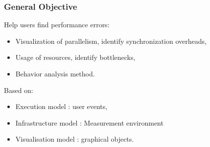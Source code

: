\begin{frame}
\frametitle{General Objective}
\begin{block}{Help users find performance errors:}
\begin{itemize}
\item Visualization of parallelism, identify synchronization overheads,\\
\item Usage of resources, identify bottlenecks, \\
\item Behavior analysis method.
\end{itemize}
\end{block}
\pause
\begin{block}{Based on:}
\begin{itemize}
\item Execution model : user events,\\
\item Infrastructure model : Measurement environment\\
\item Visualisation model : graphical objects.
\end{itemize}
\end{block}
\end{frame}

